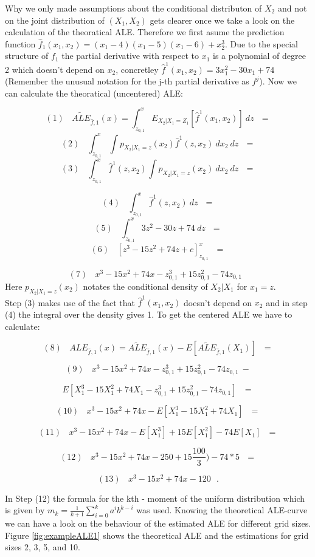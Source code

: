 \documentclass[
]{krantz}
\begin{document}
Why we only made assumptions about the conditional distributon of \(X_2\) and not on the joint distribution of \((X_1,X_2)\) gets clearer once we take a look on the calculation of the theoratical ALE. Therefore we first asume the prediction function \(\hat{f}_1 (x_1, x_2) = (x_1-4)(x_1-5)(x_1-6) + x_2^3\). Due to the special structure of \(f_1\) the partial derivative with respect to \(x_1\) is a polynomial of degree 2 which doesn't depend on \(x_2\), concretley \(\hat{f}^1(x_1,x_2) = 3x_1^2 -30x_1 +74\) (Remember the unusual notation for the j-th partial derivative as \(f^{j}\)).
Now we can calculate the theoratical (uncentered) ALE:

\[(1)~~~~\widetilde{ALE}_{\hat{f},1}(x) = \int_{z_{0,1}}^x E_{X_2\vert X_1= Z_1}[\hat{f}^1(x_1,x_2)]~dz~~~=\]
\[(2)~~~~ \int_{z_{0,1}}^x \int p_{X_2\vert X_1 = z }(x_2)\hat{f}^1(z,x_2)~dx_2~dz~~~=\]
\[(3)~~~~ \int_{z_{0,1}}^x \hat{f}^1(z,x_2)\int p_{X_2\vert X_1=z}(x_2)~dx_2~dz~~~=\]

\[(4)~~~~ \int_{z_{0,1}}^x \hat{f}^1(z,x_2)~dz~~~=\]
\[(5)~~~~ \int_{z_{0,1}}^x  3z^2 -30z +74~dz~~~=\]
\[(6)~~~~ [z^3 -15z^2 +74z + c]_{z_{0,1}}^x~~~=\]

\[(7)~~~~ x^3 -15x^2 +74x - z_{0,1} ^ 3 + 15 z_{0,1}^2 - 74z_{0,1}~~~\]
Here \(p_{X_2\vert X_1=z}(x_2)\) notates the conditional density of \(X_2\vert X_1\) for \(x_1 = z\).\\
Step (3) makes use of the fact that \(\hat{f}^1(x_1,x_2)\) doesn't depend on \(x_2\) and in step (4) the integral over the density gives 1.
To get the centered ALE we have to calculate:

\[(8)~~~~ALE_{\hat{f},1}(x) = \widetilde{ALE}_{\hat{f},1}(x) - E[\widetilde{ALE}_{\hat{f},1}(X_1)] ~~~=\]

\[(9)~~~~ x^3 - 15x^2 +74x - z_{0,1} ^ 3 + 15 z_{0,1}^2 - 74z_{0,1}  ~- \]

\[ E[X_1^3 -15X_1^2 +74X_1 - z_{0,1} ^ 3 + 15 z_{0,1}^2 - 74z_{0,1}] ~~~=\]

\[(10)~~~~ x^3 -15x^2 +74x - E[X_1^3 -15X_1^2 +74X_1] ~~~=\]

\[(11)~~~~ x^3 -15x^2 +74x - E[X_1^3] +15E[X_1^2] -74E[X_1] ~~~=\]

\[(12)~~~~ x^3 -15x^2 +74x - 250 +15 \frac{100}{3}) - 74* 5 ~~~=\]

\[(13)~~~~ x^3 -15x^2 +74x - 120~~~.\]

In Step (12) the formula for the kth - moment of the uniform distribution which is given by \(m_k = \frac{1}{k+1}\sum_{i=0}^k a^i b^{k-i}\) was used.
Knowing the theoretical ALE-curve we can have a look on the behaviour of the estimated ALE for different grid sizes. Figure \ref{fig:exampleALE1} shows the theoretical ALE and the estimations for grid sizes 2, 3, 5, and 10.
\end{document}
